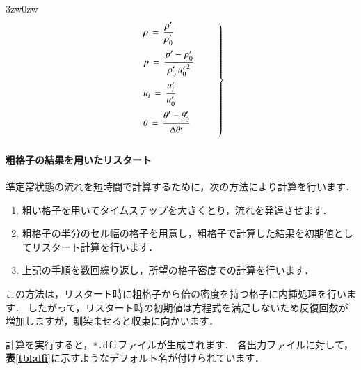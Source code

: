 \begin{indentation}{3zw}{0zw}
\begin{equation}
\left.
\begin{array}{l}
\vspace{2mm}
\displaystyle{ \rho \,=\, \frac{\rho^{\prime}}{\rho_{0}^{\prime}} } \\
\vspace{2mm}
\displaystyle{ p \,=\, \frac{p^{\prime}-p_{0}^{\prime}}{\rho_{0}^{\prime}\,{u_{0}^{\prime}}^{2}} } \\
\vspace{2mm}
\displaystyle{ u_{i} \,=\, \frac{u_{i}^{\prime}}{u_0^{\prime}} } \\
\vspace{2mm}
\displaystyle{ \theta \,=\, \frac{\theta^{\prime}-\theta_{0}^{\prime}}{\Delta \theta^{\prime}} } 
\end{array} \qquad \right \}
\end{equation}


\paragraph{粗格子の結果を用いたリスタート}
準定常状態の流れを短時間で計算するために，次の方法により計算を行います．

\begin{enumerate}
\item 粗い格子を用いてタイムステップを大きくとり，流れを発達させます．
\item 粗格子の半分のセル幅の格子を用意し，粗格子で計算した結果を初期値としてリスタート計算を行います．
\item 上記の手順を数回繰り返し，所望の格子密度での計算を行います．
\end{enumerate}

この方法は，リスタート時に粗格子から倍の密度を持つ格子に内挿処理を行います．
したがって，リスタート時の初期値は方程式を満足しないため反復回数が増加しますが，馴染ませると収束に向かいます．

計算を実行すると，\verb|*.dfi|ファイルが生成されます．
各出力ファイルに対して，\textbf{表\ref{tbl:dfi}}に示すようなデフォルト名が付けられています．


\end{indentation}
